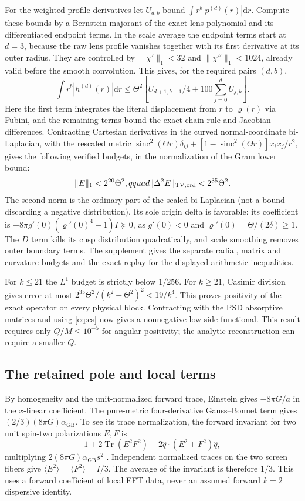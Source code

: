 \documentclass[11pt,a4paper]{article}
\theoremstyle{definition}
\theoremstyle{remark}
\newcommand{\Tr}{\operatorname{Tr}}
\newcommand{\dS}{\mathrm{d}}
\newcommand{\GB}{\alpha_{\mathrm{GB}}}
\newcommand{\sinc}{\operatorname{sinc}}
\begin{document}
For the weighted profile derivatives let
$U_{d,b}$ bound $\int r^b|p^{(d)}(r)|\dS r$. Compute these bounds by a Bernstein majorant of the exact lens polynomial and its differentiated endpoint terms. In the scale average the endpoint terms start at $d=3$, because the raw lens profile vanishes together with its first derivative at its outer radius. They are controlled by $\|\chi'\|_1<32$ and $\|\chi''\|_1<1024$, already valid before the smooth convolution. This gives, for the required pairs $(d,b)$,
\[
 \int r^b|h^{(d)}(r)|\dS r\le
 \Theta^2\left[U_{d+1,b+1}/4+
                          100\sum_{j=0}^d U_{j,b}\right].
\]
Here the first term integrates the literal displacement from $r$ to $\varrho(r)$ via Fubini, and the remaining terms bound the exact chain-rule and Jacobian differences. Contracting Cartesian derivatives in the curved normal-coordinate bi-Laplacian, with the rescaled metric
$\sinc^2(\Theta r)\delta_{ij}+[1-\sinc^2(\Theta r)]x_ix_j/r^2$,
gives the following verified budgets, in the normalization of the Gram lower bound:
\[
  \|E\|_1<2^{20}\Theta^2,qquad
  \|\Delta^2 E\|_{\rm TV,ord}<2^{35}\Theta^2 .
\]
The second norm is the ordinary part of the scaled bi-Laplacian (not a bound discarding a negative distribution). Its sole origin delta is favorable: its coefficient is
$-8\pi g'(0)(\varrho'(0)^4-1)I\succeq0$,
as $g'(0)<0$ and $\varrho'(0)=\Theta/(2\delta)\ge1$. The $D$ term kills its cusp distribution quadratically, and scale smoothing removes outer boundary terms. The supplement gives the separate radial, matrix and curvature budgets and the exact replay for the displayed arithmetic inequalities.

For $k\le21$ the $L^1$ budget is strictly below $1/256$. For $k\ge21$, Casimir division gives error at most
$2^{35}\Theta^2/(k^2-\Theta^2)^2<19/k^4$.
This proves positivity of the exact operator on every physical block. Contracting with the PSD absorptive matrices and using \eqref{eq:cs} now gives a nonnegative low-side functional. This result requires only $Q/M\le10^{-5}$ for angular positivity; the analytic reconstruction can require a smaller $Q$.

\subsection{The retained pole and local terms}
By homogeneity and the unit-normalized forward trace, Einstein gives $-8\pi G/a$ in the $x$-linear coefficient. The pure-metric four-derivative Gauss--Bonnet term gives $(2/3)(8\pi G)\GB$. To see its trace normalization, the forward invariant for two unit spin-two polarizations $E,F$ is
\[
 1+2\Tr(E^2F^2)-2\widehat q\cdot(E^2+F^2)\widehat q ,
\]
multiplying $2(8\pi G)\GB s^2$ \cite[Eq.~(56) in the HTML edition]{BCR}. Independent normalized traces on the two screen fibers give $\langle E^2\rangle=\langle F^2\rangle=I/3$. The average of the invariant is therefore $1/3$. This uses a forward coefficient of local EFT data, never an assumed forward $k=2$ dispersive identity.
\end{document}
